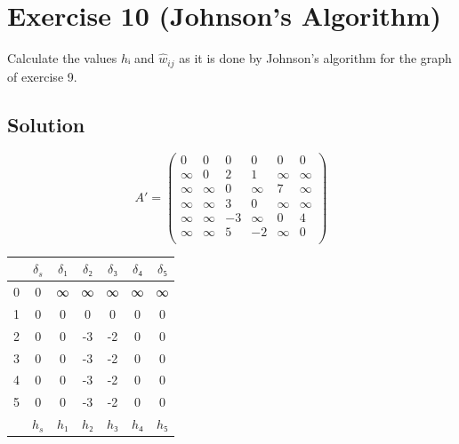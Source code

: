 \documentclass[a4paper, 12pt]{article}
\begin{document}
\section{Exercise 10 (Johnson’s Algorithm)}

Calculate the values $hᵢ$ and $\hat{w}_{ij}$ as it is done by Johnson’s
algorithm for the graph of exercise 9.

\subsection{Solution}

\begin{minipage}[b]{0.5\linewidth}
\[
A' =
\left(
    \begin{array}{cccccc}
        0   &   0   &   0   &   0   &   0   &  0    \\
        ∞   &   0   &   2   &   1   &   ∞   &  ∞    \\
        ∞   &   ∞   &   0   &   ∞   &   7   &  ∞    \\
        ∞   &   ∞   &   3   &   0   &   ∞   &  ∞    \\
        ∞   &   ∞   &   -3  &   ∞   &   0   &  4    \\
        ∞   &   ∞   &   5   &   -2  &   ∞   &  0    \\
    \end{array}
\right)
\]
\end{minipage}
\begin{minipage}[b]{0.5\linewidth}
\begin{center}
    \begin{tabular}{c|cccccc}
        &  $δ_s$ &  $δ₁$  &  $δ₂$  &  $δ₃$  &  $δ₄$  &  $δ₅$\\
    \hline
    0   &  0     &  ∞      &  ∞      &  ∞      &  ∞      &  ∞    \\
    1   &  0     &  0      &  0      &  0      &  0      &  0    \\
    2   &  0     &  0      &  -3     &  -2     &  0      &  0    \\
    3   &  0     &  0      &  -3     &  -2     &  0      &  0    \\
    4   &  0     &  0      &  -3     &  -2     &  0      &  0    \\
    5   &  0     &  0      &  -3     &  -2     &  0      &  0    \\
    \hline
        &  $h_s$ &  $h₁$  &  $h₂$  &  $h₃$  &  $h₄$  &  $h₅$\\
    \end{tabular}
\end{center}
\end{minipage}
\end{document}
